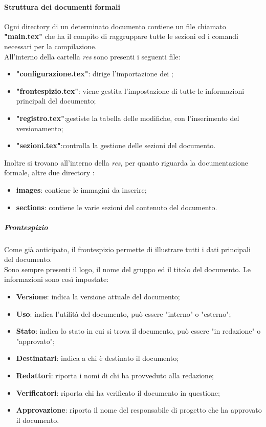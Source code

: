 \paragraph{Struttura dei documenti formali}
Ogni directory di un determinato documento contiene un file chiamato \textbf{"main.tex"} che ha il compito di raggruppare tutte le sezioni ed i comandi necessari per la compilazione.\\
All'interno della cartella \textit{res} sono presenti i seguenti file:
\begin{itemize}
	\item \textbf{"configurazione.tex"}: dirige l'importazione dei ;
	\item \textbf{"frontespizio.tex"}: viene gestita l'impostazione di tutte le informazioni principali del documento;
	\item \textbf{"registro.tex"}:gestiste la tabella delle modifiche, con l'inserimento del versionamento;
	\item \textbf{"sezioni.tex"}:controlla la gestione delle sezioni del documento.
\end{itemize}
Inoltre si trovano all'interno della \textit{res}, per quanto riguarda la documentazione formale, altre due directory :
\begin{itemize}
	\item \textbf{images}: contiene le immagini da inserire;
	\item\textbf{sections}: contiene le varie sezioni del contenuto del documento.
\end{itemize}

\subparagraph{Frontespizio}
Come già anticipato, il frontespizio permette di illustrare tutti i dati principali del documento.\\
Sono sempre presenti il logo, il nome del gruppo ed il titolo del documento.
Le informazioni sono così impostate:
\begin{itemize}
	\item\textbf{Versione}: indica la versione attuale del documento;
	\item\textbf{Uso}: indica l'utilità del documento, può essere "interno" o "esterno";
	\item\textbf{Stato}: indica lo stato in cui si trova il documento, può essere "in redazione" o "approvato";
	\item\textbf{Destinatari}: indica a chi è destinato il documento;
	\item\textbf{Redattori}: riporta i nomi di chi ha provveduto alla redazione;
	\item\textbf{Verificatori}: riporta chi ha verificato il documento in questione;
	\item\textbf{Approvazione}: riporta il nome del responsabile di progetto che ha approvato il documento.
\end{itemize}

